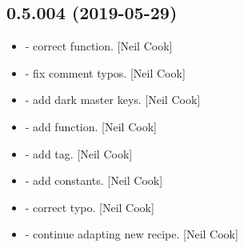 \documentclass[a4paper,10pt,english]{report}
\begin{document}
\subsection{0.5.004 (2019-05-29)}
\label{\detokenize{misc/changelog:id132}}\begin{itemize}
\item {} 
 - correct  function. {[}Neil Cook{]}

\item {} 
 - fix comment typos. {[}Neil Cook{]}

\item {} 
 - add dark master keys. {[}Neil Cook{]}

\item {} 
 - add  function. {[}Neil Cook{]}

\item {} 
 - add  tag. {[}Neil Cook{]}

\item {} 
 - add  constants. {[}Neil Cook{]}

\item {} 
 - correct typo. {[}Neil Cook{]}

\item {} 
 - continue adapting new recipe. {[}Neil Cook{]}

\end{itemize}
\end{document}
